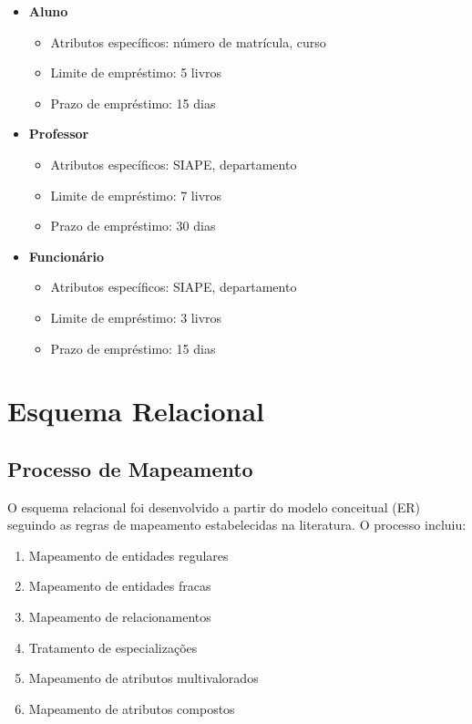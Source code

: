 \documentclass[12pt,a4paper]{article}
\begin{document}
\begin{tcolorbox}[title=Hierarquia de Especialização]
\begin{itemize}
    \item \textbf{Aluno}
    \begin{itemize}
        \item Atributos específicos: número de matrícula, curso
        \item Limite de empréstimo: 5 livros
        \item Prazo de empréstimo: 15 dias
    \end{itemize}

    \item \textbf{Professor}
    \begin{itemize}
        \item Atributos específicos: SIAPE, departamento
        \item Limite de empréstimo: 7 livros
        \item Prazo de empréstimo: 30 dias
    \end{itemize}

    \item \textbf{Funcionário}
    \begin{itemize}
        \item Atributos específicos: SIAPE, departamento
        \item Limite de empréstimo: 3 livros
        \item Prazo de empréstimo: 15 dias
    \end{itemize}
\end{itemize}
\end{tcolorbox}




\section{Esquema Relacional}

\subsection{Processo de Mapeamento}
O esquema relacional foi desenvolvido a partir do modelo conceitual (ER) seguindo as regras de mapeamento estabelecidas na literatura. O processo incluiu:

\begin{enumerate}
    \item Mapeamento de entidades regulares
    \item Mapeamento de entidades fracas
    \item Mapeamento de relacionamentos
    \item Tratamento de especializações
    \item Mapeamento de atributos multivalorados
    \item Mapeamento de atributos compostos
\end{enumerate}
\end{document}
